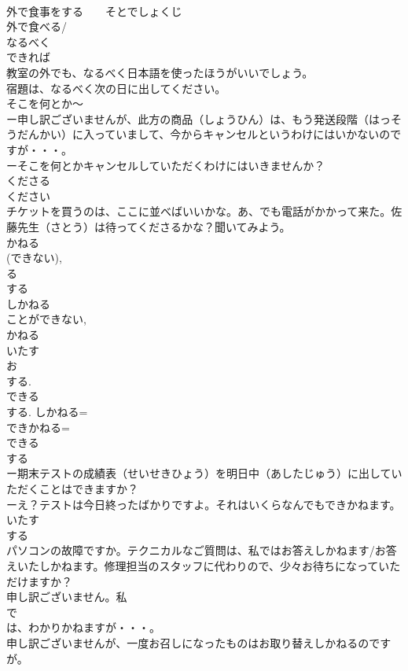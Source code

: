 \documentclass[8pt]{extreport}
\begin{document}
\begin{CJK}{UTF8}{min}
\\	外で食事をする　　そとでしょくじ
\\	外で食べる/
\\	なるべく
\\	できれば
\\	教室の外でも、なるべく日本語を使ったほうがいいでしょう。
\\	宿題は、なるべく次の日に出してください。
\\	そこを何とか～
\\	ー申し訳ございませんが、此方の商品（しょうひん）は、もう発送段階（はっそうだんかい）に入っていまして、今からキャンセルというわけにはいかないのですが・・・。
\\	ーそこを何とかキャンセルしていただくわけにはいきませんか？
\\	くださる
\\	ください
\\	チケットを買うのは、ここに並べばいいかな。あ、でも電話がかかって来た。佐藤先生（さとう）は待ってくださるかな？聞いてみよう。 
\\	かねる
\\	(できない), 
\\	る 
\\	する 
\\	しかねる
\\	ことができない, 
\\	かねる 
\\	いたす 
\\	お
\\	する. 
\\	できる 
\\	する. しかねる=
\\	できかねる=
\\	できる 
\\	する 
\\	ー期末テストの成績表（せいせきひょう）を明日中（あしたじゅう）に出していただくことはできますか？
\\	ーえ？テストは今日終ったばかりですよ。それはいくらなんでもできかねます。
\\	いたす 
\\	する 
\\	パソコンの故障ですか。テクニカルなご質問は、私ではお答えしかねます/お答えいたしかねます。修理担当のスタッフに代わりので、少々お待ちになっていただけますか？
\\	申し訳ございません。私
\\	で
\\	は、わかりかねますが・・・。
\\	申し訳ございませんが、一度お召しになったものはお取り替えしかねるのですが。

\end{CJK}
\end{document}
